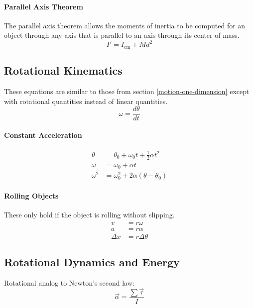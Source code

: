 \documentclass{article}
\begin{document}
            \paragraph{Parallel Axis Theorem}
            The parallel axis theorem allows the moments of inertia to be computed for an object through any axis that is parallel to an axis through its center of mass.
            \begin{equation}
                I' = I_\text{cm} + M d^2
            \end{equation}

        \subsection{Rotational Kinematics}
            These equations are similar to those from section \ref{motion-one-dimension} except with rotational quantities instead of linear quantities.
            \begin{equation}
                \omega = \frac{d\theta}{dt}
            \end{equation}
            \paragraph{Constant Acceleration}
            \begin{align}
                \theta &= \theta_0 + \omega_0 t + \frac{1}{2} \alpha t^2 \\
                \omega &= \omega_0 + \alpha t \\
                \omega^2 &= \omega_0^2 + 2 \alpha \left( \theta - \theta_0 \right)
            \end{align}

            \paragraph{Rolling Objects}
            These only hold if the object is rolling without slipping.
            \begin{align}
                \label{eq:omega-v}
                v &= r \omega \\
                a &=r \alpha \\
                \Delta x &= r \Delta \theta
            \end{align}

        \subsection{Rotational Dynamics and Energy}
            Rotational analog to Newton's second law:
            \begin{equation}
                \vec{\alpha} = \frac{\sum \vec{\tau}}{I}
            \end{equation}
\end{document}

